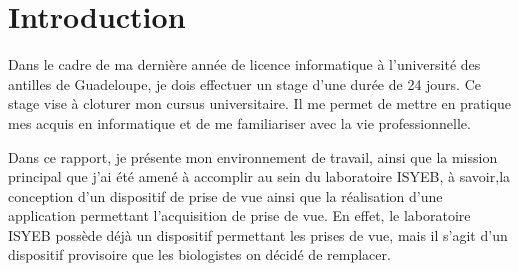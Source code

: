 \chapter{Introduction}
    Dans le cadre de ma dernière année de licence informatique à l'université des antilles de Guadeloupe, je dois effectuer un stage d'une durée de 24 jours. Ce stage vise à cloturer mon cursus universitaire.
    Il me permet de mettre en pratique mes acquis en informatique et de me familiariser avec la vie professionnelle.

    \vspace{0.5cm}
    Dans ce rapport, je présente mon environnement de travail, ainsi que la mission principal que j'ai été amené à accomplir au sein du laboratoire ISYEB, à savoir,la conception d'un dispositif de prise de vue ainsi que la réalisation d'une application permettant l'acquisition de prise de vue.
    En effet, le laboratoire ISYEB possède déjà un dispositif permettant les prises de vue, mais il s'agit d'un dispositif provisoire que les biologistes on décidé de remplacer.
    

    